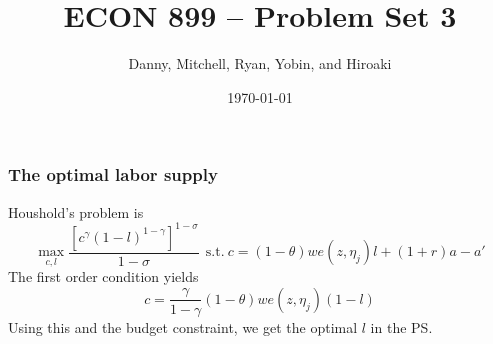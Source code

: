 \documentclass{article} %
\title{ECON 899 -- Problem Set 3}
\author{Danny, Mitchell, Ryan, Yobin, and Hiroaki}
\date{\today}
\theoremstyle{definition}
\begin{document}
\maketitle
\subsubsection*{The optimal labor supply}
Houshold's problem is
\begin{equation}
  \label{eq:1}
  \max_{c,l} \frac{\left[c^{\gamma}(1-l)^{1-\gamma}\right]^{1-\sigma}}{1-\sigma} \ \  \text{s.t.} \ c = (1-\theta)we(z,\eta_j)l + (1+r)a -a'
\end{equation}
The first order condition yields
\begin{equation}
  \label{eq:2}
  c = \frac{\gamma}{1-\gamma}(1-\theta)we(z,\eta_j)(1-l)
\end{equation}
Using this and the budget constraint, we get the optimal $l$ in the PS. 
\end{document}
